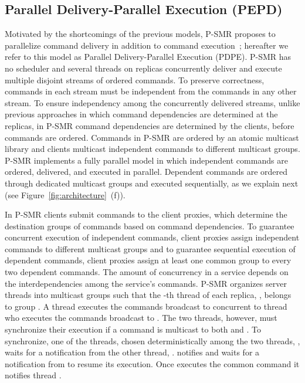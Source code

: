 \documentclass[conference]{IEEEtran}
\begin{document}
\subsection{Parallel Delivery-Parallel Execution (PEPD)}
\label{sec:pepd}







Motivated by the shortcomings of the previous models, P-SMR proposes to parallelize command delivery in addition to command execution~\cite{p-smr}; hereafter we refer to this model as Parallel Delivery-Parallel Execution (PDPE). 
P-SMR has no scheduler and several threads on replicas concurrently deliver and execute multiple disjoint streams of ordered commands. 
To preserve correctness, commands in each stream must be independent from the commands in any other stream. 
To ensure independency among the concurrently delivered streams, unlike previous approaches in which command dependencies are determined at the replicas, in P-SMR command dependencies are determined by the clients, before commands are ordered. 
Commands in P-SMR are ordered by an atomic multicast library and clients multicast independent commands to different multicast groups. 
P-SMR implements a fully parallel model in which independent commands are ordered, delivered, and executed in parallel. 
Dependent commands are ordered through dedicated multicast groups and executed sequentially, as we explain next (see Figure~\ref{fig:architecture}~(f)). 





In P-SMR clients submit commands to the client proxies, which determine the destination groups of commands based on command dependencies. 
To guarantee concurrent execution of independent commands, client proxies assign independent commands to different multicast groups and to guarantee sequential execution of dependent commands, client proxies assign at least one common group to every two dependent commands. 
The amount of concurrency in a service depends on the interdependencies among the service's commands. 
P-SMR organizes server threads into  multicast groups such that the -th thread of each replica, , belongs to group . 
A thread  executes the commands broadcast to  concurrent to thread  who executes the commands broadcast to . 
The two threads, however, must synchronize their execution if a command is multicast to both  and . 
To synchronize, one of the threads, chosen deterministically among the two threads, , waits for a notification from the other thread, . 
 notifies  and waits for a notification from  to resume its execution. 
Once  executes the common command it notifies thread . 
\end{document}
